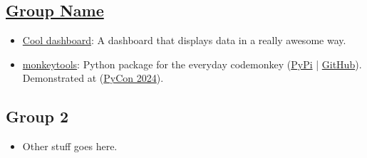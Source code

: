 \subsection*{\href{https://example.com/}{\textbf{Group Name}}}
\begin{itemize}
    \item[] \href{https://example.com}{Cool dashboard}: A dashboard that displays data in a really awesome way.
    
    \item[] \href{https://example.com}{monkeytools}: Python package for the everyday codemonkey (\href{https://pypi.org}{PyPi} | \href{https://github.com/}{GitHub}). Demonstrated at (\href{https://pycon.org/}{PyCon 2024}).
    

\end{itemize}


\subsection*{Group 2}

\begin{itemize}
    \item[] Other stuff goes here.
\end{itemize}


